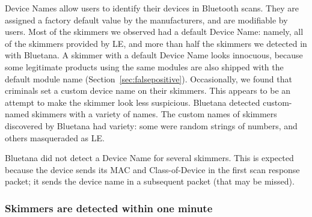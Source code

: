 Device Names allow users to identify their devices in Bluetooth scans.
%
They are assigned a factory default value by the manufacturers, and are modifiable by users.
%
%
Most of the skimmers we observed had a default Device Name: namely, all of the skimmers provided by LE, and more than half the skimmers we detected in with Bluetana. 
%
%
A skimmer with a default Device Name looks innocuous, because some legitimate products using the same modules are also shipped with the default module name (Section~\ref{sec:falsepositive}).
% 
Occasionally, we found that criminals set a custom device name on their skimmers.
%
This appears to be an attempt to make the skimmer look less suspicious.
%
Bluetana detected custom-named skimmers with a variety of names. 
%
The custom names of skimmers discovered by Bluetana had variety: some were random strings of numbers, and others masqueraded as LE.
%
 
Bluetana did not detect a Device Name for several skimmers.
%
This is expected because the device sends its MAC and Class-of-Device in the first scan response packet; it sends the device name in a subsequent packet (that may be missed).

%

%

\subsubsection*{Skimmers are detected within one minute}

